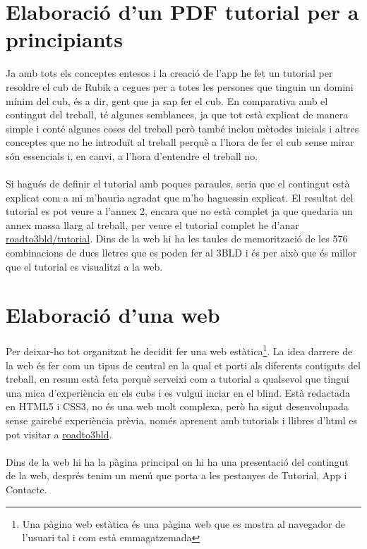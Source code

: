 \chapter{Elaboració d'un PDF tutorial per a principiants}

Ja amb tots els conceptes entesos i la creació de l'app he fet un tutorial per resoldre el cub de Rubik a cegues per a totes les persones que tinguin un domini mínim del cub, és a dir, gent que ja sap fer el cub. 
En comparativa amb el contingut del treball, té algunes semblances, ja que tot està explicat de manera simple i conté algunes coses del treball però també inclou mètodes inicials i altres conceptes que no he introduït al treball perquè a l'hora de fer el cub sense mirar són essencials i, en canvi, a l'hora d'entendre el treball no.\cite{Cuber} \cite{EdgeSetup} \cite{Progressio}
\\\\Si hagués de definir el tutorial amb poques paraules, seria que el contingut està explicat com a mi m'hauria agradat que m'ho haguessin explicat. El resultat del tutorial es pot veure a l'annex 2, encara que no està complet ja que quedaria un annex massa llarg al treball, per veure el tutorial complet he d'anar \href{https://cubderubik.github.io/roadto3bld/Tutorial.html}{roadto3bld/tutorial}. Dins de la web hi ha les taules de memorització de les 576 combinacions de dues lletres que es poden fer al 3BLD i és per això que és millor que el tutorial es visualitzi a la web.




\chapter{Elaboració d'una web}

Per deixar-ho tot organitzat he decidit fer una web estàtica\footnote{Una pàgina web estàtica és una pàgina web que es mostra al navegador de l'usuari tal i com està emmagatzemada}. La idea darrere de la web és fer com un tipus de central en la qual et porti als diferents contiguts del treball, en resum està feta perquè serveixi com a tutorial a qualsevol que tingui una mica d'experiència en els cubs i es vulgui inciar en el blind.
Està redactada en HTML5 i CSS3, no és una web molt complexa, però ha sigut desenvolupada sense gairebé experiència prèvia, només aprenent amb tutorials i llibres d'html es pot visitar a \href{https://cubderubik.github.io/roadto3bld/index.html}{roadto3bld}.
\\\\Dins de la web hi ha la pàgina principal on hi ha una presentació del contingut de la web, després tenim un menú que porta a les pestanyes de Tutorial, App i Contacte. \cite{AjudaWeb}

